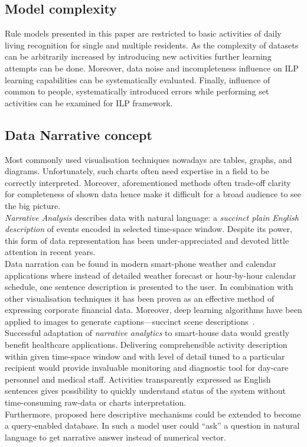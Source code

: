 \documentclass[11pt, a4paper, pdflatex, leqno, twoside, openright]{report}
\begin{document}
    \subsection{Model complexity}
Rule models presented in this paper are restricted to basic activities of daily living recognition for single and multiple residents. As the complexity of datasets can be arbitrarily increased by introducing new activities further learning attempts can be done. Moreover, data noise and incompleteness influence on ILP learning capabilities can be systematically evaluated. Finally, influence of common to people, systematically introduced errors while performing set activities can be examined for ILP framework.

    \subsection{Data Narrative concept\label{sec:narrative}}
Most commonly used visualisation techniques nowadays are tables, graphs, and diagrams. Unfortunately, such charts often need expertise in a field to be correctly interpreted. Moreover, aforementioned methods often trade-off clarity for completeness of shown data hence make it difficult for a broad audience to see the big picture.\\

\emph{Narrative Analysis} describes data with natural language: a \emph{succinct plain English description} of events encoded in selected time-space window. Despite its power, this form of data representation has been under-appreciated and devoted little attention in recent years.\\
Data narration can be found in modern smart-phone weather and calendar applications where instead of detailed weather forecast or hour-by-hour calendar schedule, one sentence description is presented to the user. In combination with other visualisation techniques it has been proven as an effective method of expressing corporate financial data. Moreover, deep learning algorithms have been applied to images to generate captions---succinct scene descriptions~\citep{vinyals2014show}.\\

Successful adaptation of \emph{narrative analytics} to smart-house data would greatly benefit healthcare applications. Delivering comprehensible activity description within given time-space window and with level of detail tuned to a particular recipient would provide invaluable monitoring and diagnostic tool for day-care personnel and medical staff. Activities transparently expressed as English sentences gives possibility to quickly understand status of the system without time-consuming raw-data or charts interpretation.\\
Furthermore, proposed here descriptive mechanisms could be extended to become a query-enabled database. In such a model user could ``ask'' a question in natural language to get narrative answer instead of numerical vector.\\
\end{document}
